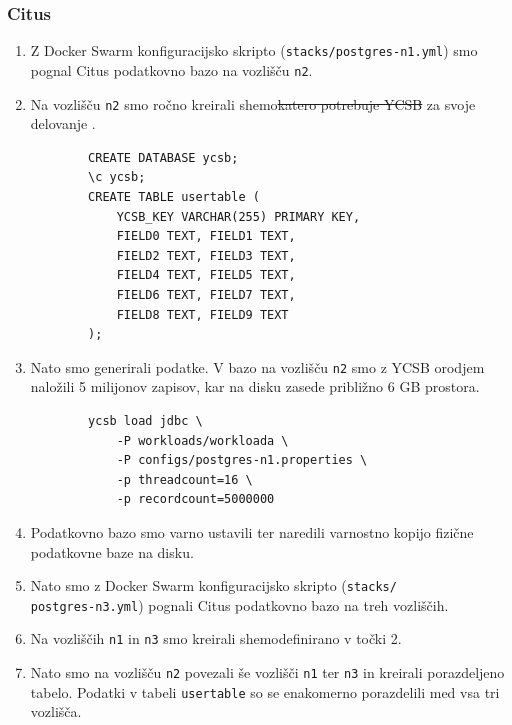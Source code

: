 \documentclass[a4paper, 12pt]{book}
\providecommand{\DIFaddtex}[1]{{\protect\color{blue}\uwave{#1}}} %
\providecommand{\DIFdeltex}[1]{{\protect\color{red}\sout{#1}}}                      %
\providecommand{\DIFaddbegin}{} %
\providecommand{\DIFaddend}{} %
\providecommand{\DIFdelbegin}{} %
\providecommand{\DIFdelend}{} %
\providecommand{\DIFadd}[1]{\texorpdfstring{\DIFaddtex{#1}}{#1}} %
\providecommand{\DIFdel}[1]{\texorpdfstring{\DIFdeltex{#1}}{}} %
\newcommand{\DIFscaledelfig}{0.5}
\newlength{\DIFdelgraphicswidth} %
\newlength{\DIFdelgraphicsheight} %
\newcommand{\DIFaddincludegraphics}[2][]{{\color{blue}\fbox{\DIFOincludegraphics[#1]{#2}}}} %
\newcommand{\DIFdelincludegraphics}[2][]{%
\sbox{\DIFdelgraphicsbox}{\DIFOincludegraphics[#1]{#2}}%
\settoboxwidth{\DIFdelgraphicswidth}{\DIFdelgraphicsbox} %
\settoboxtotalheight{\DIFdelgraphicsheight}{\DIFdelgraphicsbox} %
\scalebox{\DIFscaledelfig}{%
\parbox[b]{\DIFdelgraphicswidth}{\usebox{\DIFdelgraphicsbox}\\[-\baselineskip] \rule{\DIFdelgraphicswidth}{0em}}\llap{\resizebox{\DIFdelgraphicswidth}{\DIFdelgraphicsheight}{%
\setlength{\unitlength}{\DIFdelgraphicswidth}%
\begin{picture}(1,1)%
\thicklines\linethickness{2pt} %
{\color[rgb]{1,0,0}\put(0,0){\framebox(1,1){}}}%
{\color[rgb]{1,0,0}\put(0,0){\line( 1,1){1}}}%
{\color[rgb]{1,0,0}\put(0,1){\line(1,-1){1}}}%
\end{picture}%
}\hspace*{3pt}}} %
} %
\DeclareRobustCommand{\DIFaddbegin}{\DIFOaddbegin \let\includegraphics\DIFaddincludegraphics} %
\DeclareRobustCommand{\DIFaddend}{\DIFOaddend \let\includegraphics\DIFOincludegraphics} %
\DeclareRobustCommand{\DIFdelbegin}{\DIFOdelbegin \let\includegraphics\DIFdelincludegraphics} %
\DeclareRobustCommand{\DIFdelend}{\DIFOaddend \let\includegraphics\DIFOincludegraphics} %
\begin{document}
\subsubsection{Citus}
\begin{enumerate}
    \item Z Docker Swarm konfiguracijsko skripto (\texttt{stacks/postgres-n1.yml}) smo pognal Citus podatkovno bazo na vozlišču \texttt{n2}.
    \item Na vozlišču \texttt{n2} smo ročno kreirali shemo\DIFdelbegin \DIFdel{katero potrebuje YCSB }\DIFdelend \DIFaddbegin \DIFadd{, katero }\DIFaddend za svoje delovanje \DIFaddbegin \DIFadd{potrebuje orodje YCSB}\DIFaddend .
    \begin{listing}[H]
    \begin{verbatim}
        CREATE DATABASE ycsb;
        \c ycsb;
        CREATE TABLE usertable (
            YCSB_KEY VARCHAR(255) PRIMARY KEY,
            FIELD0 TEXT, FIELD1 TEXT,
            FIELD2 TEXT, FIELD3 TEXT,
            FIELD4 TEXT, FIELD5 TEXT,
            FIELD6 TEXT, FIELD7 TEXT,
            FIELD8 TEXT, FIELD9 TEXT
        );
    \end{verbatim}
    \label{code-ycsb-schema-postgres}
    \end{listing}
    \item Nato smo generirali podatke. V bazo na vozlišču \texttt{n2} smo z YCSB orodjem naložili 5 milijonov zapisov, kar na disku zasede približno 6 GB prostora.
    \begin{listing}[H]
    \begin{verbatim}
        ycsb load jdbc \
            -P workloads/workloada \
            -P configs/postgres-n1.properties \
            -p threadcount=16 \
            -p recordcount=5000000
    \end{verbatim}
    \label{code-ycsb-load-postgres}
    \end{listing}
    \item Podatkovno bazo smo varno ustavili ter naredili varnostno kopijo fizične podatkovne baze na disku.
    \item Nato smo z Docker Swarm konfiguracijsko skripto (\texttt{stacks/\\postgres-n3.yml}) pognali Citus podatkovno bazo na treh vozliščih.
    \item Na vozliščih \texttt{n1} in \texttt{n3} smo kreirali shemo\DIFaddbegin \DIFadd{, }\DIFaddend definirano v točki 2.
    \item Nato smo na vozlišču \texttt{n2} povezali še vozlišči \texttt{n1} ter \texttt{n3} in kreirali porazdeljeno tabelo. Podatki v tabeli \texttt{usertable} so se enakomerno porazdelili med vsa tri vozlišča.

\end{enumerate}
\end{document}
